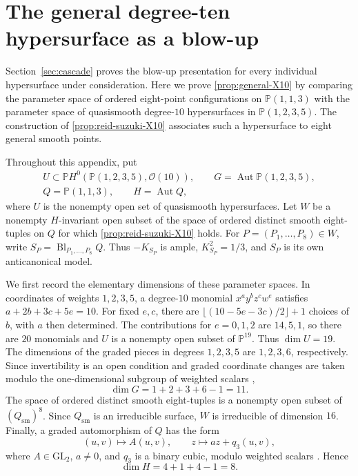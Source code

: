 \documentclass[11pt]{article}
\theoremstyle{plain}
\theoremstyle{definition}
\theoremstyle{remark}
\newcommand{\Pp}{\mathbb P}
\newcommand{\Bl}{\operatorname{Bl}}
\newcommand{\GL}{\mathrm{GL}}
\newcommand{\OO}{\mathcal O}
\begin{document}

\appendix
\section{The general degree-ten hypersurface as a blow-up}
\label{app:general-X10}

Section~\ref{sec:cascade} proves the blow-up presentation for every individual
hypersurface under consideration. Here we prove \cref{prop:general-X10}
by comparing the parameter space of ordered eight-point configurations on
\(\Pp(1,1,3)\) with the parameter space of quasismooth degree-\(10\)
hypersurfaces in \(\Pp(1,2,3,5)\). The construction of
\cref{prop:reid-suzuki-X10} associates such a hypersurface to eight general
smooth points.

Throughout this appendix, put
\[
\begin{gathered}
U\subset\Pp H^0(\Pp(1,2,3,5),\OO(10)),
\qquad G=\operatorname{Aut}\Pp(1,2,3,5),\\
Q=\Pp(1,1,3),\qquad H=\operatorname{Aut}Q,
\end{gathered}
\]
where \(U\) is the nonempty open set of quasismooth hypersurfaces.
Let \(W\) be a nonempty \(H\)-invariant open subset of the space of
ordered distinct smooth eight-tuples on \(Q\) for which
\cref{prop:reid-suzuki-X10} holds. For \(P=(P_1,\ldots,P_8)\in W\),
write \(S_P=\Bl_{P_1,\ldots,P_8}Q\). Thus \(-K_{S_P}\) is ample,
\(K_{S_P}^2=1/3\), and \(S_P\) is its own anticanonical model.

We first record the elementary dimensions of these parameter spaces. In
coordinates of weights \(1,2,3,5\), a degree-\(10\) monomial
\(x^a y^b z^c w^e\) satisfies \(a+2b+3c+5e=10\). For fixed \(e,c\),
there are \(\lfloor(10-5e-3c)/2\rfloor+1\) choices of \(b\), with \(a\)
then determined. The contributions for \(e=0,1,2\) are \(14,5,1\), so
there are \(20\) monomials and \(U\) is a nonempty open subset of
\(\Pp^{19}\). Thus \(\dim U=19\). The dimensions of the graded pieces in
degrees \(1,2,3,5\) are \(1,2,3,6\), respectively. Since invertibility is
an open condition and graded coordinate changes are taken modulo the
one-dimensional subgroup of weighted scalars
\cite[Theorem~4.2]{Cox1995},
\[
\dim G=1+2+3+6-1=11.
\]
The space of ordered distinct smooth eight-tuples is a nonempty open subset
of \((Q_{\mathrm{sm}})^8\). Since \(Q_{\mathrm{sm}}\) is an irreducible
surface, \(W\) is irreducible of dimension \(16\). Finally, a graded
automorphism of \(Q\) has the form
\[
(u,v)\longmapsto A(u,v),\qquad
z\longmapsto az+q_3(u,v),
\]
where \(A\in\GL_2\), \(a\ne0\), and \(q_3\) is a binary cubic, modulo
weighted scalars \cite[Theorem~4.2]{Cox1995}. Hence
\[
\dim H=4+1+4-1=8.
\]
\end{document}
